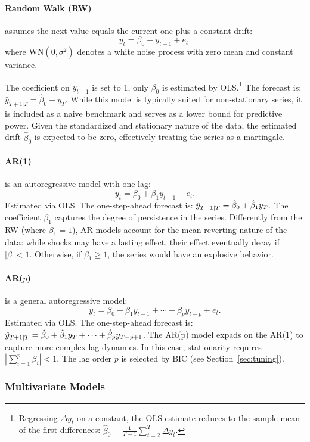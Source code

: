 \documentclass[12pt, a4paper]{article}
\begin{document}
\paragraph{Random Walk (RW)}assumes the next value equals the current one plus a constant drift:
\[
    y_t = \beta_0 + y_{t-1} + e_t.
\]
where $\mathrm{WN}(0,\sigma^2)$ denotes a white noise process with zero mean and constant variance. 

The coefficient on $y_{t-1}$ is set to 1, only $\beta_0$ is estimated by OLS.\footnote{Regressing $\Delta y_t$ on a constant, the OLS estimate reduces to the sample mean of the first differences: $\hat{\beta}_0 = \frac{1}{T-1}\sum_{t=2}^{T}\Delta y_t$.} The forecast is:$\hat{y}_{T+1|T} = \hat{\beta}_0 + y_T.$
While this model is typically suited for non-stationary series, it is included as a naive benchmark and serves as a lower bound for predictive power. Given the standardized and stationary nature of the data, the estimated drift $\hat{\beta}_0$ is expected to be zero, effectively treating the series as a martingale.
\paragraph{AR(1)}
is an autoregressive model with one lag:
\[
    y_t = \beta_0 + \beta_1 y_{t-1} + e_t.
\]
Estimated via OLS. The one-step-ahead forecast is:  $\small \hat{y}_{T+1|T} = \hat{\beta}_0 + \hat{\beta}_1 y_T.$
The coefficient $\beta_1$ captures the degree of persistence in the series. Differently from the RW (where $\beta_1 = 1$), AR models account for the mean-reverting nature of the data: while shocks may have a lasting effect, their effect eventually decay if $|\beta| < 1$. Otherwise, if $\beta_1 \geq 1$, the series would have an explosive behavior.

\paragraph{AR($p$)} is a general autoregressive model:
\[
    y_t = \beta_0 + \beta_1 y_{t-1} + \cdots + \beta_p y_{t-p} + e_t.
\]
Estimated via OLS. The one-step-ahead forecast is:  $\small \hat{y}_{T+1|T} = \hat{\beta}_0 + \hat{\beta}_1 y_T + \cdots + \hat{\beta}_p y_{T-p+1}$.
The AR(p) model expads on the AR(1) to capture more complex lag dynamics. In this case, stationarity requires $|\sum_{i=1}^p \beta_i| < 1$. The lag order $p$ is selected by BIC (see Section~\ref{sec:tuning}).


\subsubsection*{Multivariate Models}
\end{document}
